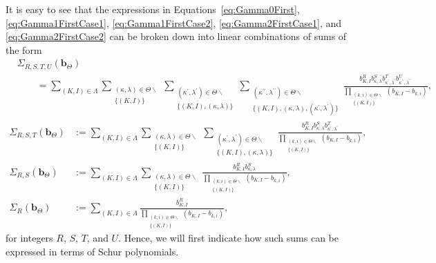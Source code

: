 \documentclass{amsart}
\theoremstyle{definition}
\theoremstyle{remark}
\newcommand{\bs}{\boldsymbol}
\begin{document}
It is easy to see that the expressions in Equations~\eqref{eq:Gamma0First},
\eqref{eq:Gamma1FirstCase1}, \eqref{eq:Gamma1FirstCase2}, \eqref{eq:Gamma2FirstCase1},
and \eqref{eq:Gamma2FirstCase2} can be broken down into linear combinations
of sums of the form
\begin{align}
\label{eq:GenericSchurSumRSTU}
    &\Sigma_{R,S,T,U}(\bs{b}_\Theta)
    \\ \nonumber &\quad\quad =
    \sum\limits_{(K,I) \in \Lambda} \sum\limits_{\substack{(\kappa,\lambda)\in\Theta\smallsetminus \\ \{(K,I)\}}}
        \sum\limits_{\substack{(\kappa^\prime,\lambda^\prime)\in\Theta\smallsetminus \\ \{(K,I),(\kappa,\lambda)\}}}
        \sum\limits_{\substack{(\kappa^{\prime\prime},\lambda^{\prime\prime})\in\Theta\smallsetminus \\
                \{(K,I),(\kappa,\lambda),(\kappa^\prime,\lambda^\prime)\}}}
            \frac{b_{K,I}^{R} b_{\kappa,\lambda}^S b_{\kappa^\prime,\lambda^\prime}^T
                    b_{\kappa^{\prime\prime},\lambda^{\prime\prime}}^U}
                {\prod\limits_{\substack{(k,i)\in\Theta\smallsetminus \\ \{ (K,I)\} }}
                    (b_{K,I} - b_{k,i}) },
\end{align}
\begin{align}
\label{eq:GenericSchurSumRST}
    \Sigma_{R,S,T}(\bs{b}_\Theta)
        &:=
        \sum\limits_{(K,I) \in \Lambda} \sum\limits_{\substack{(\kappa,\lambda)\in\Theta\smallsetminus \\ \{(K,I)\}}}
        \sum\limits_{\substack{(\kappa^\prime,\lambda^\prime)\in\Theta\smallsetminus \\ \{(K,I),(\kappa,\lambda)\}}}
            \frac{b_{K,I}^{R} b_{\kappa,\lambda}^S b_{\kappa^\prime,\lambda^\prime}^T }
                {\prod\limits_{\substack{(k,i)\in\Theta\smallsetminus \\ \{ (K,I)\} }}
                    (b_{K,I} - b_{k,i}) },
    \\
\label{eq:GenericSchurSumRS}
    \Sigma_{R,S}(\bs{b}_\Theta)
        &:=
        \sum\limits_{(K,I) \in \Lambda} \sum\limits_{\substack{(\kappa,\lambda)\in\Theta\smallsetminus \\ \{(K,I)\}}}
            \frac{b_{K,I}^{R} b_{\kappa,\lambda}^S }
                {\prod\limits_{\substack{(k,i)\in\Theta\smallsetminus \\ \{ (K,I)\} }}
                    (b_{K,I} - b_{k,i}) },
    \\
\label{eq:GenericSchurSumR}
    \Sigma_{R}(\bs{b}_\Theta)
        &:=
        \sum\limits_{(K,I) \in \Lambda}
            \frac{ b_{K,I}^{R} }
                {\prod\limits_{\substack{(k,i)\in\Theta\smallsetminus \\ \{ (K,I)\} }}
                    (b_{K,I} - b_{k,i}) },
\end{align}
for integers $R$, $S$, $T$, and $U$. Hence, we will first indicate how such sums can be
expressed in terms of Schur polynomials.
\end{document}
